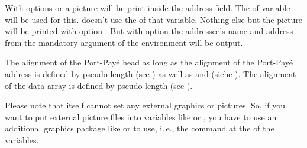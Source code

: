 With options
or  a picture will be print inside the address
field. The  of variable  will be used
for this. \KOMAScript{} doesn't use the  of that
variable. Nothing else but the picture will be printed with option
. But with option
 the addressee's name and address from
the mandatory argument of the  environment will be
output.

The alignment of the Port-Pay\'e head as long as the alignment of the
Port-Pay\'e address is defined by pseudo-length  (see
) as well as
 and  (siehe
). The alignment of
the data array is defined by pseudo-length 
(see ).

Please note that \KOMAScript{} itself cannot set any
external graphics or pictures. So, if you want to put external picture files
into variables like  or , you
have to use an additional graphics package like
 or
 to use, i.\,e., the command
 at the  of the variables.%
%
%
%
%
%
%
%


